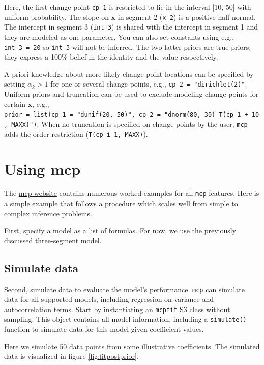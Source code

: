 \documentclass[
  american,
]{article}
\begin{document}
Here, the first change point \texttt{cp\_1} is restricted to lie in the interval {[}10, 50{]} with uniform probability. The slope on \(\mathbf{x}\) in segment 2 (\texttt{x\_2}) is a positive half-normal. The intercept in segment 3 (\texttt{int\_3}) is shared with the intercept in segment 1 and they are modeled as one parameter. You can also set constants using e.g., \texttt{int\_3\ =\ 20} so \texttt{int\_3} will not be inferred. The two latter priors are true priors: they express a 100\% belief in the identity and the value respectively.

A priori knowledge about more likely change point locations can be specified by setting \(\alpha_k > 1\) for one or several change points, e.g., \texttt{cp\_2\ =\ "dirichlet(2)"}. Uniform priors and truncation can be used to exclude modeling change points for certain \(\mathbf{x}\), e.g., \texttt{prior\ =\ list(cp\_1\ =\ "dunif(20,\ 50)",\ cp\_2\ =\ "dnorm(80,\ 30)\ T(cp\_1\ +\ 10,\ MAXX)")}. When no truncation is specified on change points by the user, \texttt{mcp} adds the order restriction (\texttt{T(cp\_i-1,\ MAXX)}).

\hypertarget{using-mcp}{%
\section{Using mcp}\label{using-mcp}}

The \href{http://lindeloev.github.io/mcp/}{mcp website} contains numerous worked examples for all \texttt{mcp} features. Here is a simple example that follows a procedure which scales well from simple to complex inference problems.

First, specify a model as a list of formulas. For now, we use \protect\hyperlink{segments_api}{the previously discussed three-segment model}.

\hypertarget{simulate}{%
\subsection{Simulate data}\label{simulate}}

Second, simulate data to evaluate the model's performance. \texttt{mcp} can simulate data for all supported models, including regression on variance and autocorrelation terms. Start by instantiating an \texttt{mcpfit} S3 class without sampling. This object contains all model information, including a \texttt{simulate()} function to simulate data for this model given coefficient values.

Here we simulate 50 data points from some illustrative coefficients. The simulated data is visualized in figure \ref{fig:fitpostprior}.
\end{document}
